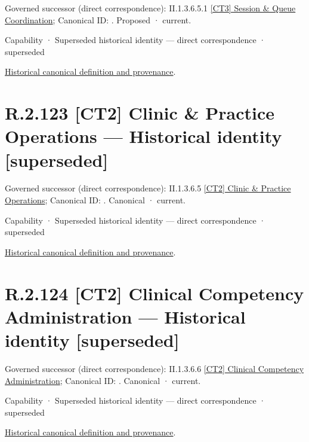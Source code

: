 {\small Governed successor (direct correspondence): II.1.3.6.5.1 \hyperref[element:22981a95ca6e466582363706fde8fceb]{[CT3] Session \& Queue Coordination}; Canonical ID: \texttt{}. Proposed · current.}\par
\label{element:5298c6170cef4f05a6d956da716071bd}
{\small Capability · Superseded historical identity — direct correspondence · superseded}\par
\href{../../../../continuum/strategy/capability/5298c6170cef4f05a6d956da716071bd.md}{Historical canonical definition and provenance}.\par
\section*{R.2.123 [CT2] Clinic \& Practice Operations — Historical identity [superseded]}
\label{navigation:R.2.123}

{\small Governed successor (direct correspondence): II.1.3.6.5 \hyperref[element:3dffe63e03124efab255204ee4e9a5d9]{[CT2] Clinic \& Practice Operations}; Canonical ID: \texttt{}. Canonical · current.}\par
\label{element:0856d2daf2ba4b92b5390b38b98efb54}
{\small Capability · Superseded historical identity — direct correspondence · superseded}\par
\href{../../../../continuum/strategy/capability/0856d2daf2ba4b92b5390b38b98efb54.md}{Historical canonical definition and provenance}.\par
\section*{R.2.124 [CT2] Clinical Competency Administration — Historical identity [superseded]}
\label{navigation:R.2.124}

{\small Governed successor (direct correspondence): II.1.3.6.6 \hyperref[element:8a99f4a6e5054d6c997bacec04805c01]{[CT2] Clinical Competency Administration}; Canonical ID: \texttt{}. Canonical · current.}\par
\label{element:8a4b918e1c9d47bb99daf2b42008ab39}
{\small Capability · Superseded historical identity — direct correspondence · superseded}\par
\href{../../../../continuum/strategy/capability/8a4b918e1c9d47bb99daf2b42008ab39.md}{Historical canonical definition and provenance}.\par
